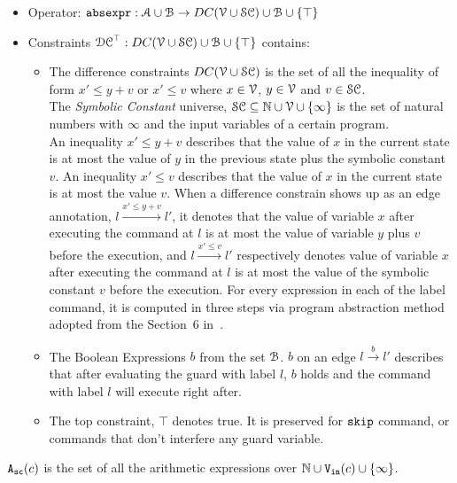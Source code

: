 \begin{itemize}
\item Operator: $\mathtt{abs}{\mathtt{expr}} : \mathcal{A} \cup \mathcal{B} \to DC(\mathcal{V}  \cup \mathcal{SC})\cup \mathcal{B} \cup \{\top\}$
%
\item Constraints $\mathcal{DC}^{\top}: DC(\mathcal{V}  \cup \mathcal{SC}) \cup \mathcal{B}\cup \{\top\}$  contains:
%
\begin{itemize}
\item The difference constraints $DC(\mathcal{V}  \cup \mathcal{SC})$ is the set of all the inequality of
form $x' \leq y + v$ or $x' \leq v$ where $x \in \mathcal{V} $, 
$y \in \mathcal{V}$ and $v \in \mathcal{SC}$.
\\
The \emph{Symbolic Constant} universe, $\mathcal{SC} \subseteq \mathbb{N} \cup \mathcal{V} \cup \{\infty \}$
is the set of natural numbers with $\infty$ and the input variables of a certain program.
\\
An inequality $x' \leq y + v$ describes that the value of $x$ in the current state is
at most the value of $y$ in the previous state plus the symbolic constant $v$.
An inequality $x' \leq v$ describes that the value of $x$ in the current state is
at most the value $v$.
When a difference constrain shows up as an edge annotation, $l \xrightarrow{x' \leq y + v} l'$,
it denotes that
the value of variable $x$
after executing the command at $l$ is at most
the value of variable $y$ plus $v$ before the execution,
and $l \xrightarrow{x' \leq v} l'$ respectively denotes value of variable $x$
after executing the command at $l$ is at most
the value of the symbolic constant $v$ before the execution.
For every expression in each of the label command, it is computed in three steps via program abstraction method adopted from the Section~6 in~\cite{sinn2017complexity}. 
%
\item The Boolean Expressions $b$ from the set $\mathcal{B}$.
$b$ on an edge $l \xrightarrow{b} l'$ describes
that after evaluating the guard with label $l$,
$b$ holds and the command with label $l$ will execute right after.
%
\item The top constraint, $\top$ denotes true. It is preserved for $\mathtt{skip}$ command,
or commands that don't interfere any guard variable.
\end{itemize}
\end{itemize}


\begin{defn}
  \label{def:symbolic_expr}
  ${\mathtt{A_{sc}}}(c)$ is the set of all the arithmetic expressions over $\mathbb{N} \cup {\ensuremath{\mathtt{V_{\mathtt{in}}}}}(c) \cup \{\infty \}$.
\end{defn}

